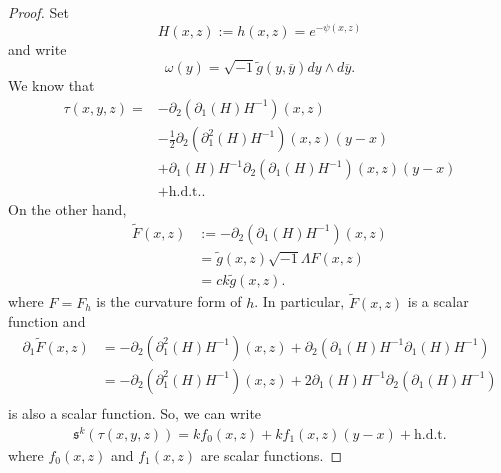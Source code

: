 \documentclass[10pt,a4paper]{amsart}
\begin{document}
\begin{proof}
Set 
\begin{equation*}
H(x,z) := h(x,z) = e^{-\psi(x,z)}
\end{equation*}
and write
\begin{equation*}
    \omega(y) = \sqrt{-1} \tilde{g}(y,\overline{y}) dy \wedge d\overline{y}.
\end{equation*}
We know that
\begin{equation*}
\begin{split}
    \tau(x,y,z) = &  - \partial_2(\partial_1 (H) {H}^{-1})(x,z) \\
    & - \frac{1}{2} \partial_2(\partial_1^2(H) {H}^{-1})(x,z)(y-x)  \\
    & + \partial_1(H) {H}^{-1} \partial_2(\partial_1(H) {H}^{-1})(x,z)(y-x) \\
    & + \text{h.d.t.}.
\end{split}
\end{equation*}
On the other hand,
\begin{equation*}
\begin{split}
    \tilde{F}(x,z) & := -\partial_2(\partial_1 (H){H}^{-1})(x,z) \\
    & = \tilde{g}(x,z) \sqrt{-1} \Lambda F(x,z) \\
    & =  c k \tilde{g}(x,z).
\end{split}
\end{equation*}
where $F = F_{h}$ is the curvature form of $h$. In particular, $\tilde{F}(x,z)$ is a scalar function and 
\begin{equation*}
    \begin{split}
        \partial_1 \tilde{F}(x,z) & = -\partial_2(\partial_1^2 (H){H}^{-1})(x,z) + \partial_2 (\partial_1 (H){H}^{-1} \partial_1(H) {H}^{-1})  \\
        & = -\partial_2(\partial_1^2 (H){H}^{-1})(x,z) + 2 \partial_1 (H){H}^{-1} \partial_2 (\partial_1(H) {H}^{-1})  \\
\end{split}
\end{equation*}
is also a scalar function. So, we can write
\begin{equation*}
\begin{split}
    \mathfrak{s}^k(\tau(x,y,z)) =   kf_0(x,z) + kf_1(x,z) (y-x) + \text{h.d.t.}
\end{split}
\end{equation*}
where $f_0(x,z)$ and $f_1(x,z)$ are scalar functions. 




\end{proof}
\end{document}
